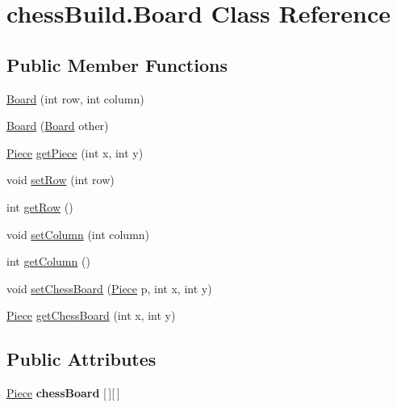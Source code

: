 \hypertarget{classchess_build_1_1_board}{}\section{chess\+Build.\+Board Class Reference}
\label{classchess_build_1_1_board}
\subsection*{Public Member Functions}
\begin{DoxyCompactItemize}
\item 
\hyperlink{classchess_build_1_1_board_a41548dc02b3082c7a8f93a02919ec564}{Board} (int row, int column)
\item 
\hyperlink{classchess_build_1_1_board_a07018ac4fd8680cf86449f9446f81e9d}{Board} (\hyperlink{classchess_build_1_1_board}{Board} other)
\item 
\hyperlink{classchess_build_1_1_piece}{Piece} \hyperlink{classchess_build_1_1_board_ad0b01d5dfb0e517bc41593f57d2cc073}{get\+Piece} (int x, int y)
\item 
void \hyperlink{classchess_build_1_1_board_a1b83ee1026b863cb830768d555906931}{set\+Row} (int row)
\item 
int \hyperlink{classchess_build_1_1_board_a7d54f83b6a633d9d6eb39220a99e67ef}{get\+Row} ()
\item 
void \hyperlink{classchess_build_1_1_board_a946a842a42f1f5f172901232e13a4eff}{set\+Column} (int column)
\item 
int \hyperlink{classchess_build_1_1_board_a90f2eeba043a2a1524e350a745610da7}{get\+Column} ()
\item 
void \hyperlink{classchess_build_1_1_board_ad3229351025edaff14e166ab1c7bd5b9}{set\+Chess\+Board} (\hyperlink{classchess_build_1_1_piece}{Piece} p, int x, int y)
\item 
\hyperlink{classchess_build_1_1_piece}{Piece} \hyperlink{classchess_build_1_1_board_ac58d9824c7dc8ee3449896ae38802f22}{get\+Chess\+Board} (int x, int y)
\end{DoxyCompactItemize}
\subsection*{Public Attributes}
\begin{DoxyCompactItemize}
\item 
\mbox{\label{classchess_build_1_1_board_ae059d3225c704edb16a4cd5c38bb3698}} 
\hyperlink{classchess_build_1_1_piece}{Piece} {\bfseries chess\+Board} \mbox{[}$\,$\mbox{]}\mbox{[}$\,$\mbox{]}
\end{DoxyCompactItemize}


